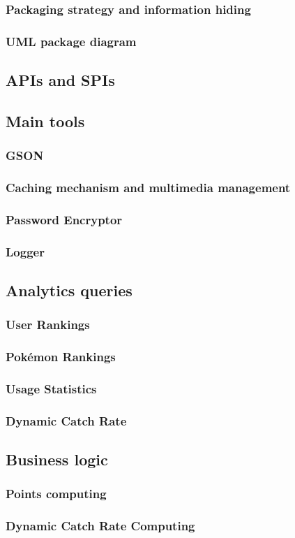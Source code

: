 \subsubsection{Packaging strategy and information hiding}
\subsubsection{UML package diagram}


\subsection{APIs and SPIs}

\subsection{Main tools}
\subsubsection{GSON}
\subsubsection{Caching mechanism and multimedia management}
\subsubsection{Password Encryptor}
\subsubsection{Logger}

\subsection{Analytics queries}
\subsubsection{User Rankings}
\subsubsection{Pokémon Rankings}
\subsubsection{Usage Statistics}
\subsubsection{Dynamic Catch Rate}


\subsection{Business logic}
\subsubsection{Points computing}
\subsubsection{Dynamic Catch Rate Computing}


